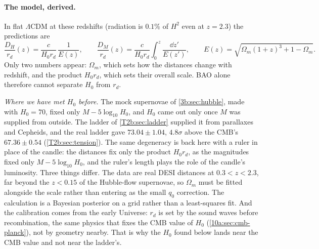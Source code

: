 \paragraph{The model, derived.} In flat $\Lambda$CDM at these redshifts (radiation is $0.1\%$ of $H^2$ even at $z=2.3$) the predictions are
\begin{equation}
  \frac{D_H}{r_d}(z)=\frac{c}{H_0r_d}\,\frac{1}{E(z)},\qquad
  \frac{D_M}{r_d}(z)=\frac{c}{H_0r_d}\int_0^z\frac{\dd z'}{E(z')},\qquad
  E(z)=\sqrt{\Omega_m(1+z)^3+1-\Omega_m}.
  \label{T2b:eq:bao-lcdm}
\end{equation}
Only two numbers appear: $\Omega_m$, which sets how the distances change with redshift, and the product $H_0r_d$, which sets their overall scale. BAO alone therefore cannot separate $H_0$ from $r_d$.

\emph{Where we have met $H_0$ before.} The mock supernovae of \cref{3b:sec:hubble}, made with $H_0=70$, fixed only $M-5\log_{10}H_0$, and $H_0$ came out only once $M$ was supplied from outside. The ladder of \cref{T2b:sec:ladder} supplied it from parallaxes and Cepheids, and the real ladder gave $73.04\pm1.04$, $4.8\sigma$ above the CMB's $67.36\pm0.54$ (\cref{T2b:sec:tension}). The same degeneracy is back here with a ruler in place of the candle: the distances fix only the product $H_0r_d$, as the magnitudes fixed only $M-5\log_{10}H_0$, and the ruler's length plays the role of the candle's luminosity. Three things differ. The data are real DESI distances at $0.3<z<2.3$, far beyond the $z<0.15$ of the Hubble-flow supernovae, so $\Omega_m$ must be fitted alongside the scale rather than entering as the small $q_0$ correction. The calculation is a Bayesian posterior on a grid rather than a least-squares fit. And the calibration comes from the early Universe: $r_d$ is set by the sound waves before recombination, the same physics that fixes the CMB value of $H_0$ (\cref{10a:sec:cmb-planck}), not by geometry nearby. That is why the $H_0$ found below lands near the CMB value and not near the ladder's.

